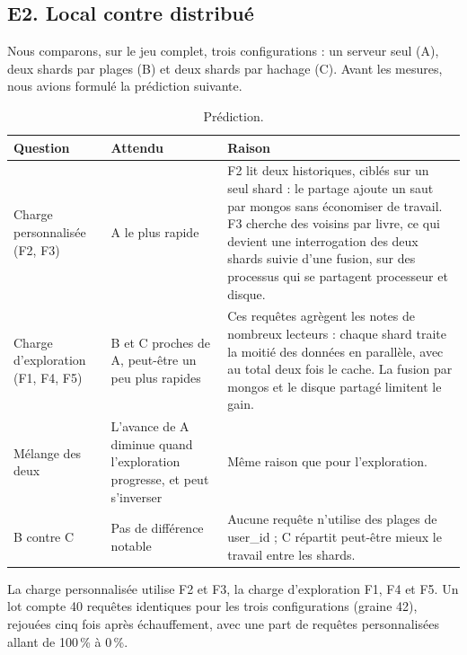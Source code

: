 \documentclass[11pt,a4paper]{article}
\begin{document}
\subsection{E2. Local contre distribué}
Nous comparons, sur le jeu complet, trois configurations : un serveur seul (A), deux shards par plages (B) et deux shards par hachage (C). Avant les mesures, nous avions formulé la prédiction suivante.

\begin{table}[H]
\centering
\small
\begin{tabular}{>{\raggedright\arraybackslash}p{0.2317\dimexpr\linewidth-6\tabcolsep\relax}>{\raggedright\arraybackslash}p{0.2805\dimexpr\linewidth-6\tabcolsep\relax}>{\raggedright\arraybackslash}p{0.4878\dimexpr\linewidth-6\tabcolsep\relax}}
\toprule
\textbf{Question} & \textbf{Attendu} & \textbf{Raison} \\
\midrule
Charge personnalisée (F2, F3) & A le plus rapide & F2 lit deux historiques, ciblés sur un seul shard : le partage ajoute un saut par mongos sans économiser de travail. F3 cherche des voisins par livre, ce qui devient une interrogation des deux shards suivie d'une fusion, sur des processus qui se partagent processeur et disque. \\
\addlinespace[1pt]
Charge d'exploration (F1, F4, F5) & B et C proches de A, peut-être un peu plus rapides & Ces requêtes agrègent les notes de nombreux lecteurs : chaque shard traite la moitié des données en parallèle, avec au total deux fois le cache. La fusion par mongos et le disque partagé limitent le gain. \\
\addlinespace[1pt]
Mélange des deux & L'avance de A diminue quand l'exploration progresse, et peut s'inverser & Même raison que pour l'exploration. \\
\addlinespace[1pt]
B contre C & Pas de différence notable & Aucune requête n'utilise des plages de user\_id ; C répartit peut-être mieux le travail entre les shards. \\
\bottomrule
\end{tabular}
\caption{Prédiction.}
\end{table}

La charge personnalisée utilise F2 et F3, la charge d'exploration F1, F4 et F5. Un lot compte 40 requêtes identiques pour les trois configurations (graine 42), rejouées cinq fois après échauffement, avec une part de requêtes personnalisées allant de 100\,\% à 0\,\%.
\end{document}
